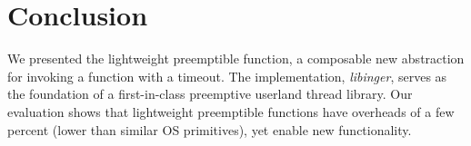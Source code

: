 \section{Conclusion}

We presented the lightweight preemptible function, a composable new abstraction
for invoking a function with a timeout.  The implementation, \textit{libinger},
serves as the foundation of
a first-in-class preemptive userland thread library.  Our evaluation shows that
lightweight
preemptible functions have overheads of a few percent (lower than similar OS
primitives), yet enable new functionality.
